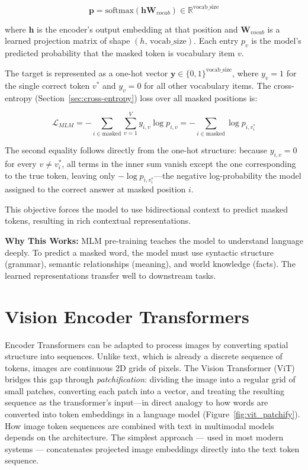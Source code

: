 \documentclass{book}
\begin{document}
\begin{equation}
\mathbf{p} = \text{softmax}(\mathbf{h} \mathbf{W}_{vocab})
    \in \mathbb{R}^{\text{vocab\_size}}
\end{equation}

where $\mathbf{h}$ is the encoder's output embedding at that position and
$\mathbf{W}_{vocab}$ is a learned projection matrix of shape
$(h,\, \text{vocab\_size})$. Each entry $p_v$ is the model's predicted
probability that the masked token is vocabulary item $v$.

The target is represented as a one-hot vector
$\mathbf{y} \in \{0,1\}^{\text{vocab\_size}}$, where $y_v = 1$ for the single
correct token $v^*$ and $y_v = 0$ for all other vocabulary items. The
cross-entropy (Section~\ref{sec:cross-entropy}) loss over all masked positions is:

\begin{equation}
\mathcal{L}_{MLM}
    = -\sum_{i \in \text{masked}} \sum_{v=1}^{V} y_{i,v} \log p_{i,v}
    = -\sum_{i \in \text{masked}} \log p_{i,v^*_i}
\end{equation}

The second equality follows directly from the one-hot structure: because
$y_{i,v} = 0$ for every $v \neq v^*_i$, all terms in the inner sum vanish
except the one corresponding to the true token, leaving only
$-\log p_{i,v^*_i}$---the negative log-probability the model assigned to the
correct answer at masked position $i$.

This objective forces the model to use bidirectional context to predict masked tokens, resulting in rich contextual representations.

\textbf{Why This Works:} MLM pre-training teaches the model to understand language deeply. To predict a masked word, the model must use syntactic structure (grammar), semantic relationships (meaning), and world knowledge (facts). The learned representations transfer well to downstream tasks.

\section{Vision Encoder Transformers}
\label{sec:vit}

Encoder Transformers can be adapted to process images by converting spatial structure into
sequences. Unlike text, which is already a discrete sequence of tokens, images are
continuous 2D grids of pixels. The Vision Transformer (ViT)
\cite{dosovitskiy2020image} bridges this gap through \textit{patchification}:
dividing the image into a regular grid of small patches, converting each patch
into a vector, and treating the resulting sequence as the transformer's input---in
direct analogy to how words are converted into token embeddings in a language model
(Figure~\ref{fig:vit_patchify}). How image token sequences are combined with text in multimodal models depends on the architecture. The simplest approach — used in most modern systems — concatenates projected image embeddings directly into the text token sequence.
\end{document}
